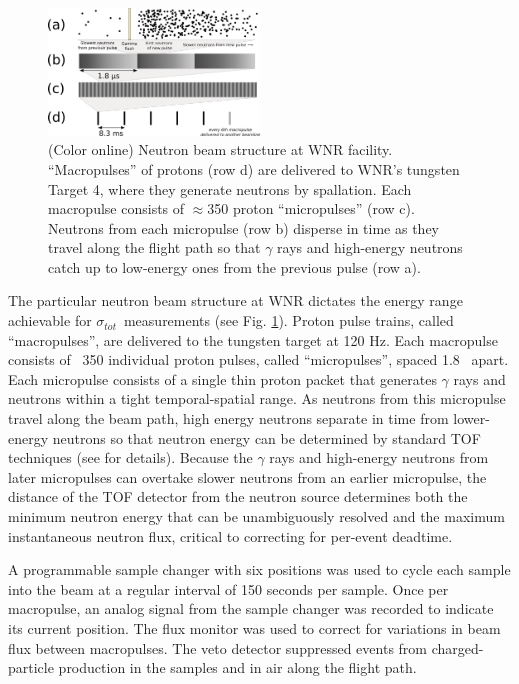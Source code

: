 \documentclass[twocolumn,secnumarabic,amssymb, nobibnotes, aps, prl,
superscriptaddress, nobalancelastpage]{revtex4}
\newcommand{\tot}{\ensuremath{\sigma_{tot}}}
\begin{document}
\begin{figure}
    \includegraphics[width=0.5\textwidth]{figures/beamStructure.png}
    \caption{(Color online) Neutron beam structure at WNR facility.
        ``Macropulses'' of protons (row d) are delivered to
        WNR's tungsten Target 4, where they generate neutrons by spallation.
        Each macropulse consists of
        $\approx$350 proton ``micropulses'' (row c). Neutrons
        from each micropulse (row b) disperse in
        time as they travel along the flight path so that $\gamma$ rays and high-energy 
    neutrons catch up to low-energy ones from the previous pulse (row a).}
    \label{BeamStructure}
\end{figure}

The particular neutron beam structure at WNR dictates the energy range
achievable for \tot\ measurements (see Fig. \ref{BeamStructure}).
Proton pulse trains, called ``macropulses'', are delivered to the tungsten target at 120 Hz.
Each macropulse consists of ~350 individual proton pulses, called
``micropulses'', spaced 1.8 
\micro\second\ apart. Each micropulse consists of a single thin proton packet
that generates $\gamma$ rays and neutrons within a tight
temporal-spatial range. As neutrons from this micropulse travel along the beam path, 
high energy neutrons separate in time from lower-energy neutrons so that neutron
energy can be determined by standard TOF techniques (see \cite{Moore1980} for details).
Because the $\gamma$ rays and high-energy neutrons from later micropulses can
overtake slower neutrons from an earlier micropulse, the distance of the TOF
detector from the neutron source determines both the minimum neutron energy that can be 
unambiguously resolved and the maximum instantaneous neutron flux, critical to correcting
for per-event deadtime.

A programmable sample changer with six positions
was used to cycle each sample into the beam at a regular interval of 150 seconds 
per sample. Once per macropulse, an analog signal from the sample changer
was recorded to indicate its current position.
The flux monitor was used to correct for variations in beam flux between 
macropulses. The veto detector suppressed events from charged-particle production 
in the samples and in air along the flight path.
\end{document}
